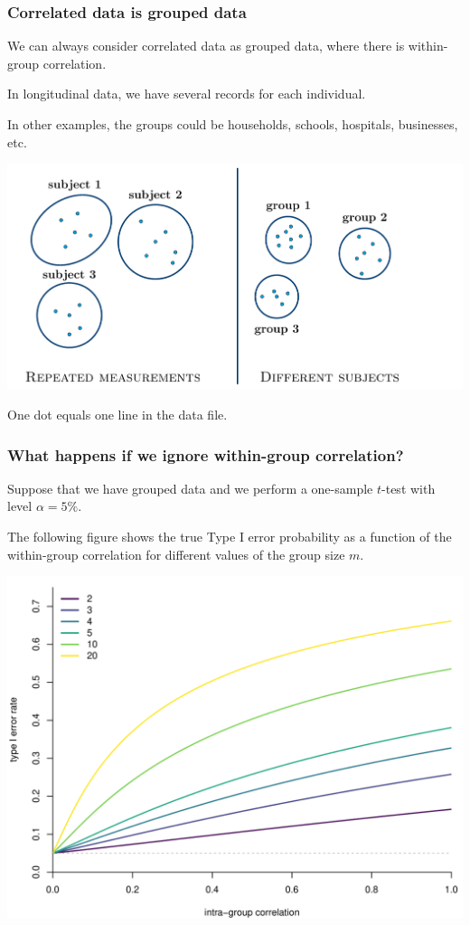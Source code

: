 \documentclass{beamer}
\begin{document}
\begin{frame}
\frametitle{Correlated data \textbf{is} grouped data}
\bi
\item We can always consider correlated data as grouped data, where there is within-group correlation.
\item In longitudinal data, we have several records for each individual.
\item In other examples, the groups could be households, schools, hospitals, businesses, etc.
\ei
\begin{center}
\includegraphics[width = 0.8\linewidth]{img/c5/06-correlated-groups.pdf}
\end{center}
One dot equals one line in the data file.
\end{frame} 


\begin{frame}
\frametitle{What happens if we ignore within-group correlation?}
\bi
\item Suppose that we have grouped data and we perform a one-sample $t$-test with level $\alpha=5\%$.
\item The following figure shows the true Type I error probability as a function of the within-group correlation for different values of the group size $m$. 
\begin{center}
\includegraphics[width = 0.65 \linewidth]{img/c5/06-correlated-typeIerrorinf.pdf}
\end{center}
\ei
\end{frame}
 
\end{document}
